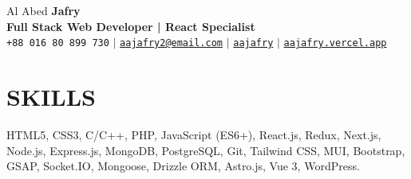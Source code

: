 \documentclass[letterpaper,11pt]{article}
\begin{document}
\begin{center}
  {\Huge Al Abed \textbf{\Huge Jafry}} \\ \vspace{5pt}
  \textbf{\Large\textcolor{dark-grey}{Full Stack Web Developer | React Specialist}} \\ \vspace{3pt}
  \small \faPhone* \texttt{+88 016 80 899 730} \hspace{1pt} $|$
  \hspace{1pt} \faEnvelope \hspace{2pt} \href{mailto:aajafry2@email.com}{\texttt{aajafry2@email.com}} \hspace{1pt} $|$ 
  \hspace{1pt} \faGithub \hspace{2pt} \href{https://github.com/aajafry}{\texttt{aajafry}} \hspace{1pt} $|$ 
  \hspace{1pt} \faGlobe \hspace{2pt} \href{https://aajafry.vercel.app}{\texttt{aajafry.vercel.app}} \hspace{1pt}
\end{center}

\section{SKILLS}
 \begin{itemize}[leftmargin=0in, label={}]
    \small{\item{
    {HTML5, CSS3, C/C++, PHP, JavaScript (ES6+), React.js, Redux, Next.js, Node.js, Express.js, MongoDB, PostgreSQL, Git, Tailwind CSS, MUI, Bootstrap, GSAP, Socket.IO, Mongoose, Drizzle ORM, Astro.js, Vue 3, WordPress.}
    }}
 \end{itemize}

\end{document}
